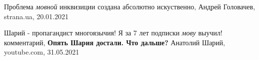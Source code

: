  
 
 
 
 
Проблема \emph{мовной} инквизиции создана абсолютно искуственно, Андрей
Головачев, strana.ua, 20.01.2021

Шарий - пропагандист многоязычия! Я за 7 лет подписки \emph{мову} выучил!
комментарий, \textbf{Опять Шария достали. Что дальше?} Анатолий Шарий, youtube.com, 31.05.2021
